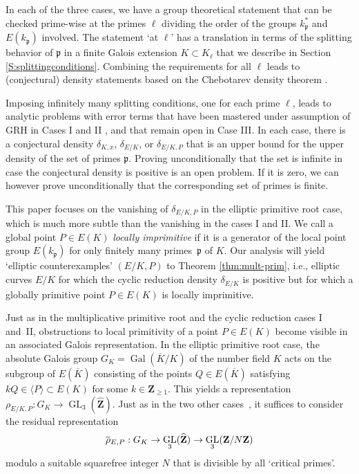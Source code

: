 \documentclass{amsart}
\theoremstyle{plain}
\theoremstyle{definition}
\DeclareMathOperator{\GL}{GL}
\DeclareMathOperator{\Gal}{Gal}
\newcommand{\Zee}{{\mathbf{Z}}}
\newcommand{\Zhat}{{\widehat {\Zee}}}
\newcommand{\gothp}{{\mathfrak{p}}}
\newcommand{\mybar}[1]{
  \mathchoice
  {#1\llap{$\overline{\phantom{\displaystyle\rm#1}}$}}
  {#1\llap{$\overline{\phantom{\textstyle\rm#1}}$}}
  {#1\llap{$\overline{\phantom{\scriptstyle\rm#1}}$}}
  {#1\llap{$\overline{\phantom{\scriptscriptstyle\rm#1}}$}}
}
\renewcommand{\bar}{\mybar}
\begin{document}
In each of the three cases, we have a group theoretical statement that
can be checked prime-wise at the primes $\ell$ dividing
the order of the groups $k_\gothp^*$ and $E(k_\gothp)$ involved. 
The statement `at $\ell$' has a translation in terms of the splitting behavior 
of $\gothp$ in a finite Galois extension $K\subset K_\ell$ 
that we describe in Section \ref{S:splittingconditions}.
Combining the requirements for all $\ell$ leads to (conjectural) density statements based on the
Chebotarev density theorem \cite{Stev-Lenstra}.

Imposing infinitely many splitting conditions, one for each prime $\ell$, 
leads to analytic problems with error terms that have been mastered 
under assumption of GRH in Cases I \cites{Hooley, Cooke-Weinberger, Lenstra} and II 
\cites{Serre3, Gupta-Murty-cycl, Campagna-Stevenhagen}, 
and that remain open in Case III.
In each case, there is a conjectural density 
$\delta_{K, x}$, $\delta_{E/K}$, or 
$\delta_{E/K, P}$ that is an upper bound for the upper density of the set of primes $\gothp$.
Proving unconditionally that the set is infinite in case 
the conjectural density is positive is an open problem.
If it is zero, we can however prove unconditionally that the corresponding set of primes is finite.

This paper focuses on the vanishing of $\delta_{E/K, P}$ 
in the elliptic primitive root case, which is much more subtle 
than the vanishing in the cases I and II. 
We call a global point $P\in E(K)$ \emph{locally imprimitive} 
if it is a generator of the local point group $E(k_\gothp)$ for 
only finitely many primes~$\gothp$ of $K$.
Our analysis will yield `elliptic counterexamples' $(E/K, P)$ to 
Theorem \ref{thm:mult-prim}, i.e., 
elliptic curves $E/K$ for which the cyclic reduction density 
$\delta_{E/K}$ is positive but for which
a globally primitive point $P\in E(K)$ is locally imprimitive.

Just as in the multiplicative primitive root and the cyclic reduction cases I and~II, obstructions to
local primitivity of a point $P\in E(K)$ become visible in an associated Galois representation.
In the elliptic primitive root case, the absolute Galois group  $G_K=\Gal(\overline K/K)$
of the number field $K$ acts on the subgroup of
$E(\overline K)$ consisting of the points $Q\in E(\overline K)$ satisfying  
$kQ\in\langle P\rangle\subset E(K)$ for some $k\in\Zee_{\ge1}$.
This yields a representation
$
\rho_{E/K, P}: G_K\to\GL_3(\Zhat).
$
Just as in the two other 
cases~\cite{Campagna-Stevenhagen},
it suffices to consider the residual representation
\begin{equation}
\label{residualrep}
\bar\rho_{E, P}: G_K\to\GL_3(\Zhat)\to\GL_3(\Zee/N\Zee)
\end{equation}
modulo a suitable squarefree integer $N$ that is divisible by all `critical primes'.
\end{document}
